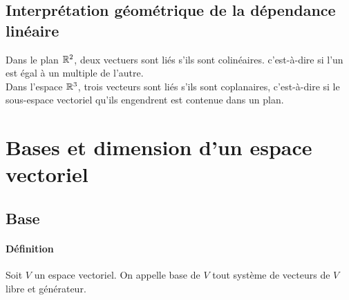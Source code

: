 \subsection{Interprétation géométrique de la dépendance linéaire}
Dans le plan $\mathbb{R}^2$, deux vectuers sont liés s'ils sont colinéaires. c'est-à-dire si l'un est égal à un multiple de l'autre. \\
Dans l'espace $\mathbb{R}^3$, trois vecteurs sont liés s'ils sont coplanaires, c'est-à-dire si le sous-espace vectoriel qu'ils engendrent est contenue dans un plan.

%
%
\section{Bases et dimension d'un espace vectoriel}
%
%

%
\subsection{Base}
%
\paragraph{Définition} Soit $V$ un espace vectoriel. On appelle base de $V$ tout système de vecteurs de $V$ libre et générateur.

